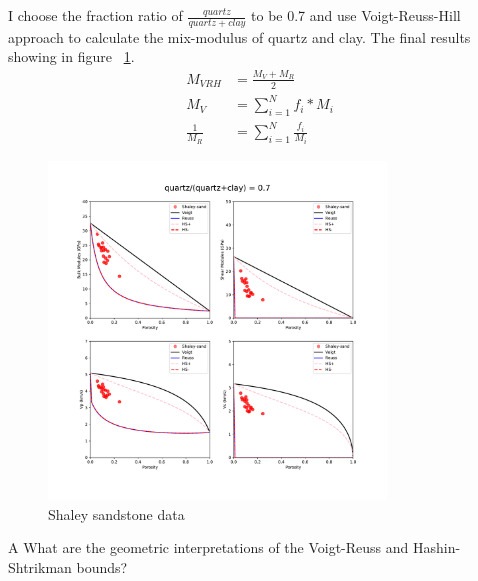 \begin{solution}

    I choose the fraction ratio of $\frac{quartz}{quartz+clay} $ to be 0.7 
    and use Voigt-Reuss-Hill approach to calculate the mix-modulus of quartz and clay.
    The final results showing in figure ~\ref{fig:p1-problem-4}.
    \begin{align}
        M_{VRH} & = \frac{M_V+M_R}{2}  \\
        M_V & =  \sum_{i = 1}^{N}  f_i*M_i \\
        \frac{1}{M_R} & =  \sum_{i = 1}^{N} \frac{f_i}{M_i}
        \label{equ:hill}
    \end{align}

    \begin{figure}[H]
        \centering
        \includegraphics[width=0.8\textwidth]{figures/homework-1/p1-problem-4.pdf}
        \caption{Shaley sandstone data}
        \label{fig:p1-problem-4}
    \end{figure}
\end{solution}


\begin{problem}{A}
    What are the geometric interpretations of the Voigt-Reuss and Hashin-Shtrikman bounds?
\end{problem}

